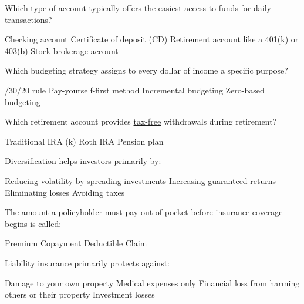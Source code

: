 \documentclass[12pt]{exam}
\begin{document}
\begin{questions}
  \begin{mcquestion}[2]
    Which type of account typically offers the easiest access to funds for daily transactions?
    \begin{choices}
      \CorrectChoice Checking account
      \choice Certificate of deposit (CD)
      \choice Retirement account like a 401(k) or 403(b)
      \choice Stock brokerage account
    \end{choices}
  \end{mcquestion}

  \begin{mcquestion}[2]
    Which budgeting strategy assigns to every dollar of income a specific purpose?
    \begin{choices}
      /30/20 rule
      \choice Pay-yourself-first method
      \choice Incremental budgeting
      \CorrectChoice Zero-based budgeting
    \end{choices}
  \end{mcquestion}

  \begin{mcquestion}[2]
    Which retirement account provides \underline{tax-free} withdrawals during retirement?
    \begin{choices}
      \choice Traditional IRA
      (k)
      \CorrectChoice Roth IRA
      \choice Pension plan
    \end{choices}
  \end{mcquestion}

  \begin{mcquestion}[2]
    Diversification helps investors primarily by:
    \begin{choices}
      \CorrectChoice Reducing volatility by spreading investments
      \choice Increasing guaranteed returns
      \choice Eliminating losses
      \choice Avoiding taxes
    \end{choices}
  \end{mcquestion}

  \begin{mcquestion}[2]
    The amount a policyholder must pay out-of-pocket before insurance coverage begins is called:
    \begin{choices}
      \choice Premium
      \choice Copayment
      \CorrectChoice Deductible
      \choice Claim
    \end{choices}
  \end{mcquestion}

  \begin{mcquestion}[2]
    Liability insurance primarily protects against:
    \begin{choices}
      \choice Damage to your own property
      \choice Medical expenses only
      \CorrectChoice Financial loss from harming others or their property
      \choice Investment losses
    \end{choices}
  \end{mcquestion}


\end{questions}
\end{document}
